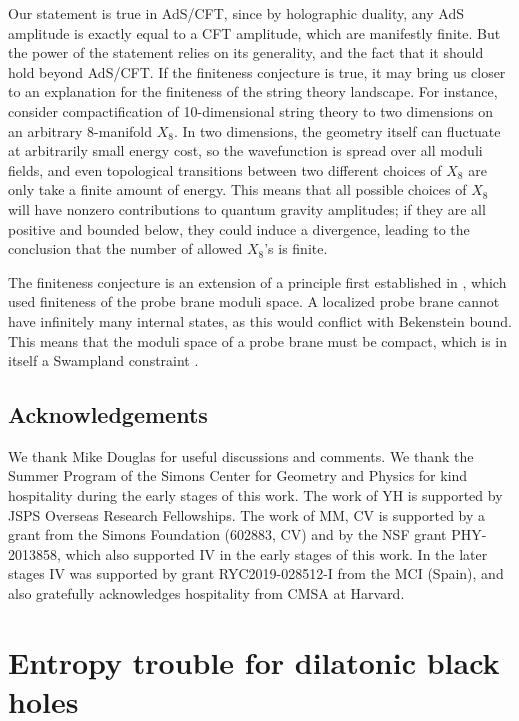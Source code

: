 \documentclass[11pt]{article}
\numberwithin{equation}{section}
\numberwithin{equation}{section}
\theoremstyle{remark}
\begin{document}
Our statement is true in AdS/CFT, since by holographic duality, any AdS amplitude is exactly equal to a CFT amplitude, which are manifestly finite. But the power of the statement relies on its generality, and the fact that it should hold beyond AdS/CFT. If the finiteness conjecture is true, it may bring us closer to an explanation for the finiteness of the string theory landscape. For instance, consider compactification of 10-dimensional string theory to two dimensions on an arbitrary 8-manifold $X_8$. In two dimensions, the geometry itself can fluctuate at arbitrarily small energy cost, so the wavefunction is spread over all moduli fields, and even topological transitions between two different choices of $X_8$ are only take a finite amount of energy. This means that all possible choices of $X_8$  will have nonzero contributions to quantum gravity amplitudes; if they are all positive and bounded below, they could induce a divergence, leading to the conclusion that the number of allowed $X_8$'s is finite. 

The finiteness conjecture is an extension of a principle first established in \cite{Hamada:2021bbz}, which used finiteness of the probe brane moduli space. A localized probe brane cannot have infinitely many internal states, as this would conflict with Bekenstein bound. This means that the moduli space of a probe brane must be compact, which is in itself a Swampland constraint \cite{Hamada:2021bbz,Bedroya:2021fbu}.

\subsection*{Acknowledgements}
We thank Mike Douglas for useful discussions and comments.
We thank the Summer Program of the Simons Center for Geometry and Physics for kind hospitality during the early stages of this work. The work of YH is supported by JSPS Overseas Research Fellowships. The work of MM, CV is supported by a grant from the Simons Foundation (602883, CV) and by the NSF grant PHY-2013858, which also supported IV in the early stages of this work. In the later stages IV was supported by grant RYC2019-028512-I from the MCI (Spain), and also gratefully acknowledges hospitality from CMSA at Harvard.


\appendix
\section{Entropy trouble for dilatonic black holes\label{app:stab}}
\end{document}
